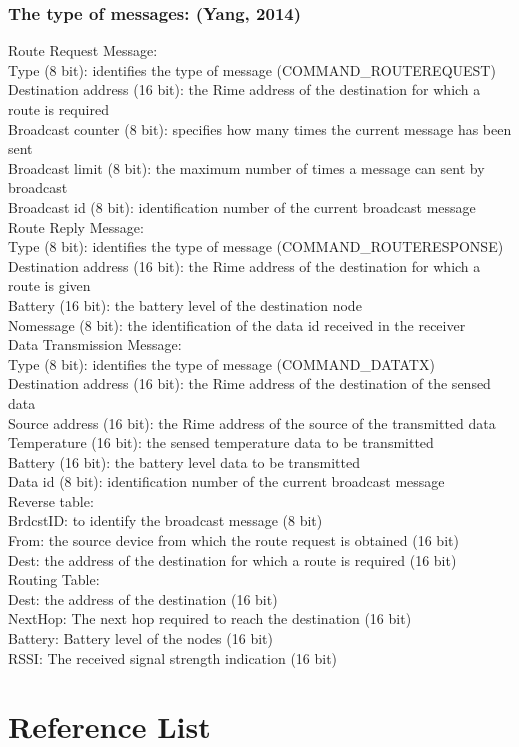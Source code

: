 \documentclass[a4paper]{article}
\begin{document}
\subsubsection*{The type of messages: (Yang, 2014)} 
Route Request Message:\\
Type (8 bit): identifies the type of message (COMMAND\_ROUTEREQUEST)\\
Destination address (16 bit):  the Rime address of the destination for which a route is required \\
Broadcast counter (8 bit): specifies how many times the current message has been sent \\
Broadcast limit (8 bit): the maximum number of times a message can sent by broadcast \\
Broadcast id (8 bit): identification number of the current broadcast message \\

Route Reply Message: \\
Type (8 bit): identifies the type of message (COMMAND\_ROUTERESPONSE)\\
Destination address (16 bit):  the Rime address of the destination for which a route is given \\
Battery (16 bit): the battery level of the destination node \\
Nomessage (8 bit): the identification of the data id received in the receiver \\

Data Transmission Message:\\
Type (8 bit): identifies the type of message (COMMAND\_DATATX) \\
Destination address (16 bit):  the Rime address of the destination of the sensed data \\
Source address (16 bit):  the Rime address of the source of the transmitted data \\
Temperature (16 bit): the sensed temperature data to be transmitted \\
Battery (16 bit): the battery level data to be transmitted \\
Data id (8 bit): identification number of the current broadcast message \\

Reverse table: \\
BrdcstID: to identify the broadcast message (8 bit) \\
From: the source device from which the route request is obtained (16 bit) \\
Dest: the address of the destination for which a route is required (16 bit) \\


Routing Table: \\
Dest: the address of the destination (16 bit) \\
NextHop: The next hop required to reach the destination (16 bit)  \\
Battery: Battery level of the nodes (16 bit) \\
RSSI: The received signal strength indication (16 bit) \\


\newpage
\section{Reference List}


	
\end{document}

